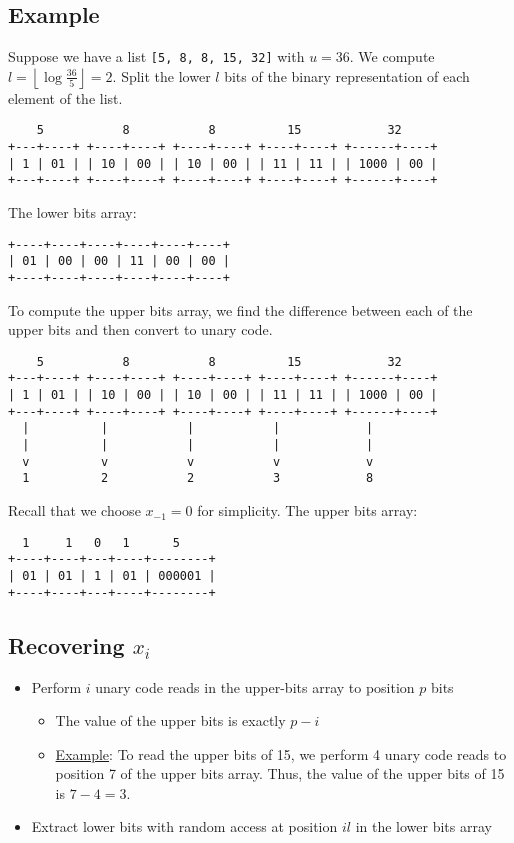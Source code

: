 \documentclass[10pt]{article}
\begin{document}
\subsection{Example}\label{example}
Suppose we have a list \texttt{[5, 8, 8, 15, 32]} with \(u= 36\).
We compute \(l = \left \lfloor \log{\frac{36}{5}} \right \rfloor = 2 \).
Split the lower \(l\) bits of the binary representation of each element of the list.
\begin{verbatim}
    5           8           8          15            32
+---+----+ +----+----+ +----+----+ +----+----+ +------+----+
| 1 | 01 | | 10 | 00 | | 10 | 00 | | 11 | 11 | | 1000 | 00 |
+---+----+ +----+----+ +----+----+ +----+----+ +------+----+
\end{verbatim}
The lower bits array:
\begin{verbatim}
+----+----+----+----+----+----+
| 01 | 00 | 00 | 11 | 00 | 00 |
+----+----+----+----+----+----+
\end{verbatim}
To compute the upper bits array, we find the difference between each of the upper bits
and then convert to unary code.
\begin{verbatim}
    5           8           8          15            32
+---+----+ +----+----+ +----+----+ +----+----+ +------+----+
| 1 | 01 | | 10 | 00 | | 10 | 00 | | 11 | 11 | | 1000 | 00 |
+---+----+ +----+----+ +----+----+ +----+----+ +------+----+
  |          |           |           |            |
  |          |           |           |            |
  v          v           v           v            v
  1          2           2           3            8
\end{verbatim}
Recall that we choose \(x_{-1} = 0\) for simplicity.
The upper bits array:
\begin{verbatim}
  1     1   0   1      5
+----+----+---+----+--------+
| 01 | 01 | 1 | 01 | 000001 |
+----+----+---+----+--------+
\end{verbatim}

\subsection{Recovering \texorpdfstring{\(x_i\)}{xi}}\label{recovering-xi}
\begin{itemize}
\item
    Perform \(i\) unary code reads in the upper-bits array to position \(p\) bits
    \begin{itemize}
    \item
        The value of the upper bits is exactly \(p - i\)
    \item
        \underline{Example}: To read the upper bits of 15, we perform 4 unary code reads to 
        position 7 of the upper bits array.
        Thus, the value of the upper bits of 15 is \(7 - 4 = 3\).
    \end{itemize}
\item
    Extract lower bits with random access at position \(il\) in the lower bits array
\end{itemize}
\end{document}
